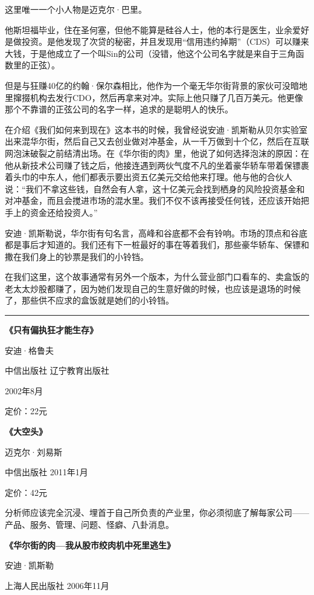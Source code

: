 这里唯一一个小人物是迈克尔·巴里。

他斯坦福毕业，住在圣何塞，但他不能算是硅谷人士，他的本行是医生，业余爱好是做投资。是他发现了次贷的秘密，并且发现用``信用违约掉期''（CDS）可以赚来大钱，于是他成立了一个叫Sin的公司（没错，他这个公司名字就是来自于三角函数里的正弦）。

但是与狂赚40亿的约翰·保尔森相比，他作为一个毫无华尔街背景的家伙可没暗地里撺掇机构去发行CDO，然后再拿来对冲。实际上他只赚了几百万美元。他更像那个不靠谱的正弦公司的名字一样，追求的是聪明人的快乐。

在介绍《我们如何来到现在》这本书的时候，我曾经说安迪·凯斯勒从贝尔实验室出来混华尔街，然后自己又去创业做对冲基金，从一千万做到十个亿，然后在互联网泡沫破裂之前结清出场。在《华尔街的肉》里，他说了如何选择泡沫的原因：在他从新技术公司赚了钱之后，他接连遇到两伙气度不凡的坐着豪华轿车带着保镖裹着头巾的中东人，他们都表示要出资五亿美元交给他来打理。他与他的合伙人说：``我们不拿这些钱，自然会有人拿，这十亿美元会找到栖身的风险投资基金和对冲基金，而且会搅进市场的混水里。我们不仅不该再接受任何钱，还应该开始把手上的资金还给投资人。''

安迪·凯斯勒说，华尔街有句名言，高峰和谷底都不会有铃响。市场的顶点和谷底都是事后才知道的。我们还有下一桩最好的事在等着我们，那些豪华轿车、保镖和撒在我们身上的钞票是我们的小铃铛。

在我们这里，这个故事通常有另外一个版本，为什么营业部门口看车的、卖盒饭的老太太炒股都赚了，因为她们发现自己的生意好做的时候，也应该是退场的时候了，那些供不应求的盒饭就是她们的小铃铛。

\begin{center}\rule{3in}{0.4pt}\end{center}

\textbf{《只有偏执狂才能生存》}

安迪·格鲁夫

中信出版社 辽宁教育出版社

2002年8月

定价：22元

\textbf{《大空头》}

迈克尔·刘易斯

中信出版社 2011年1月

定价：42元

分析师应该完全沉浸、埋首于自己所负责的产业里，你必须彻底了解每家公司------产品、服务、管理、问题、怪癖、八卦消息。

\textbf{《华尔街的肉---我从股市绞肉机中死里逃生》}

安迪·凯斯勒

上海人民出版社 2006年11月

